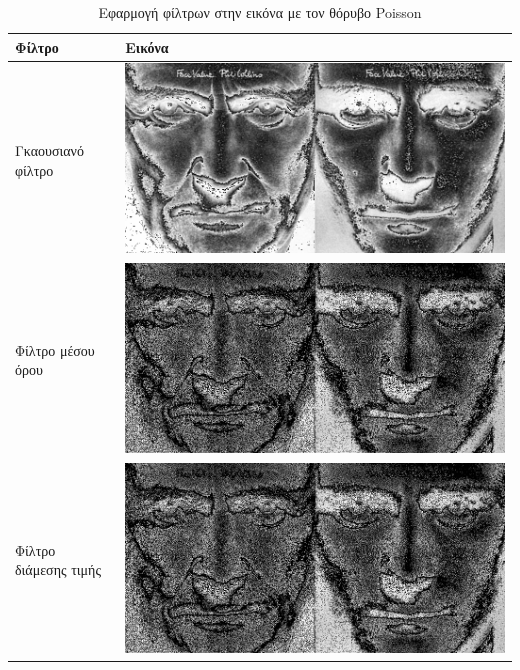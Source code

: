 \begin{table}[H]
  \centering
  \begin{tabular}{| p{8cm} | p{8cm}|}
    \hline
    \textbf{Φίλτρο} & \textbf{Εικόνα} \\
    \hline
    Γκαουσιανό φίλτρο &
    \includegraphics[width=\linewidth]{Figures/poisson_gauss_sharp} \\
    \hline
    Φίλτρο μέσου όρου &
    \includegraphics[width=\linewidth]{Figures/poisson_average_sharp} \\
    \hline
    Φίλτρο διάμεσης τιμής &
    \includegraphics[width=\linewidth]{Figures/poisson_median_blur} \\
    \hline
  \end{tabular}
  \caption{Εφαρμογή φίλτρων στην εικόνα με τον θόρυβο Poisson}
  \label{tab:poisson}
\end{table}

